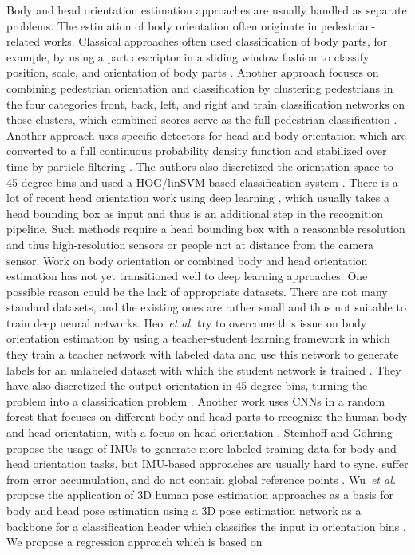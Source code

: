 \documentclass[a4paper, 10pt, conference]{ieeeconf}
\begin{document}
Body and head orientation estimation approaches are usually handled as separate problems. The estimation of body orientation often originate in pedestrian-related works. Classical approaches often used classification of body parts, for example, by using a part descriptor in a sliding window fashion to classify position, scale, and orientation of body parts \cite{andrilukaPictorialStructuresRevisited2009}. Another approach focuses on combining pedestrian orientation and classification by clustering pedestrians in the four categories front, back, left, and right and train classification networks on those clusters, which combined scores serve as the full pedestrian classification \cite{enzweilerIntegratedPedestrianClassification2010}. Another approach uses specific detectors for head and body orientation which are converted to a full continuous probability density function and stabilized over time by particle filtering \cite{flohrJointProbabilisticPedestrian2014,flohrProbabilisticFrameworkJoint2015}. The authors also discretized the orientation space to 45-degree bins and used a HOG/linSVM based classification system \cite{flohrJointProbabilisticPedestrian2014}. There is a lot of recent head orientation work using deep learning \cite{guptaNoseEyesEars2019,ruizFineGrainedHeadPose2018,panSelfPacedDeepRegression2020,huDeepConvolutionalNeural2021,valleMultitaskHeadPose2020,xiaEfficientMultitaskNeural2021}, which usually takes a head bounding box as input and thus is an additional step in the recognition pipeline. Such methods require a head bounding box with a reasonable resolution and thus high-resolution sensors or people not at distance from the camera sensor. Work on body orientation or combined body and head orientation estimation has not yet transitioned well to deep learning approaches. One possible reason could be the lack of appropriate datasets. There are not many standard datasets, and the existing ones are rather small and thus not suitable to train deep neural networks. Heo~\textit{et al.} try to overcome this issue on body orientation estimation by using a teacher-student learning framework in which they train a teacher network with labeled data and use this network to generate labels for an unlabeled dataset with which the student network is trained \cite{heoEstimationPedestrianPose2019}. They have also discretized the output orientation in 45-degree bins, turning the problem into a classification problem \cite{heoEstimationPedestrianPose2019}. Another work uses CNNs in a random forest that focuses on different body and head parts to recognize the human body and head orientation, with a focus on head orientation \cite{leeHeadBodyOrientation2019}. Steinhoff and Göhring propose the usage of IMUs to generate more labeled training data for body and head orientation tasks, but IMU-based approaches are usually hard to sync, suffer from error accumulation, and do not contain global reference points \cite{steinhoffPedestrianHeadBody2020}. Wu~\textit{et al.} propose the application of 3D human pose estimation approaches as a basis for body and head pose estimation using a 3D pose estimation network as a backbone for a classification header which classifies the input in  orientation bins \cite{wuMEBOWMonocularEstimation2020}. We propose a regression approach which is based on 
\end{document}
